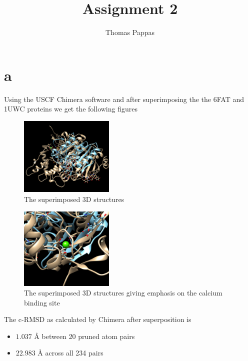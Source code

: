 \documentclass[a4paper,11pt]{article}
\begin{document}
\title{Assignment 2}
\author{Thomas Pappas}
\maketitle

\section*{a}

Using the USCF Chimera software and after superimposing the the 6FAT and 1UWC proteins we get the following figures

\begin{figure}[h]
\centering
\includegraphics[width=0.4\textwidth]{superimposed}
\caption{The superimposed 3D structures}
\end{figure}
\begin{figure}[h]
\centering
\includegraphics[width=0.4\textwidth]{superimposed_CA}
\caption{The superimposed 3D structures giving emphasis on the calcium binding site}
\end{figure}

The c-RMSD as calculated by Chimera after superposition is
\begin{itemize}
  \item $1.037$ \AA \; between 20 pruned atom pairs
  \item $22.983$ \AA \; across all 234 pairs
\end{itemize}

\end{document}
